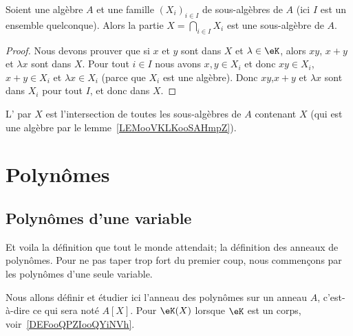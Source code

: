 \begin{lemma}   \label{LEMooVKLKooSAHmpZ}
    Soient une algèbre \( A\) et une famille \( (X_i)_{i\in I}\) de sous-algèbres de \( A\) (ici \( I\) est un ensemble quelconque). Alors la partie \( X=\bigcap_{i\in I}X_i\) est une sous-algèbre de \( A\).
\end{lemma}

\begin{proof}
    Nous devons prouver que si \( x\) et \( y\) sont dans \( X\) et \( \lambda\in \eK\), alors \( xy\), \( x+y\) et \( \lambda x\) sont dans \( X\). Pour tout \( i\in I\) nous avons \( x,y\in X_i\) et donc \( xy\in X_i\), \( x+y\in X_i\) et \( \lambda x\in X_i\) (parce que \( X_i\) est une algèbre). Donc \( xy\),\( x+y\) et \( \lambda x\) sont dans \( X_i\) pour tout \( I\), et donc dans \( X\).
\end{proof}

\begin{definition}\label{DefkAXaWY}
    L' par \( X\) est l'intersection de toutes les sous-algèbres de \( A\) contenant \( X\) (qui est une algèbre par le lemme~\ref{LEMooVKLKooSAHmpZ}).
\end{definition}

\section{Polynômes}

\subsection{Polynômes d'une variable}

Et voila la définition que tout le monde attendait; la définition des anneaux de polynômes. Pour ne pas taper trop fort du premier coup, nous commençons par les polynômes d'une seule variable.

Nous allons définir et étudier ici l'anneau des polynômes sur un anneau \( A\), c'est-à-dire ce qui sera noté \( A[X]\). Pour \( \eK(X)\) lorsque \( \eK\) est un corps, voir~\ref{DEFooQPZIooQYiNVh}.


